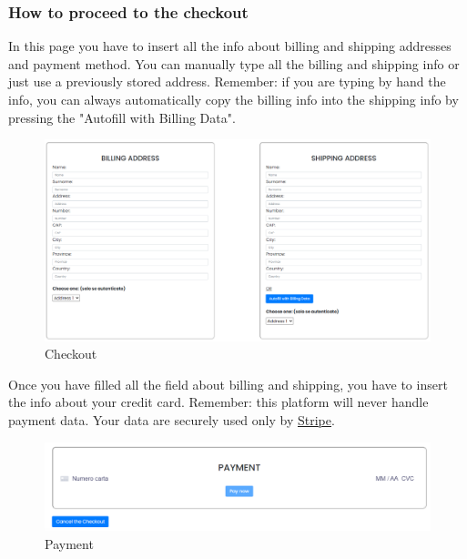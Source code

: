\subsubsection{How to proceed to the checkout} \label{_checkout}
In this page you have to insert all the info about billing and shipping addresses and payment method.
You can manually type  all the billing and shipping info or just use a previously stored address.
Remember: if you are typing by hand the info, you can always automatically copy the billing info into the shipping info by pressing the "Autofill with Billing Data".
\begin{figure}[H]
    \centering
    \includegraphics[width=\linewidth]{res/images/cliente/checkout.png}
    \caption{Checkout}
\end{figure}
Once you have filled all the field about billing and shipping, you have to insert the info about your credit card.
Remember: this platform will never handle payment data. Your data are securely used only by \href{https://stripe.com}{Stripe}.
\begin{figure}[H]
    \centering
    \includegraphics[width=\linewidth]{res/images/cliente/payment.png}
    \caption{Payment}
\end{figure}

